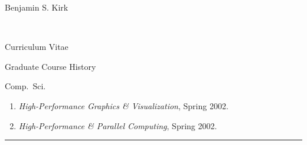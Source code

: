 \documentclass[11pt]{report}
\begin{document}
\begin{cv}{\centerline{Benjamin S. Kirk}\\
    \centerline{\small Curriculum Vitae}}
\begin{cvlist}{Graduate Course History}
      \vspace{.5em}
      \item[Comp.\ Sci.]
	
	\begin{enumerate}
	  \item \emph{High-Performance Graphics \& Visualization}, Spring 2002.
	  \item \emph{High-Performance \& Parallel Computing}, Spring 2002.      
	\end{enumerate}
  \end{cvlist}
  


{\hfill \hrule\hfill\vspace{.1mm} \\}
\end{cv}
\end{document}
